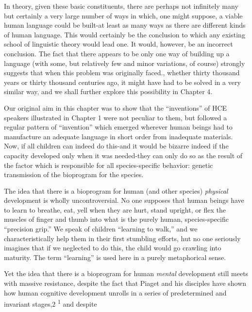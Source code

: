 In theory, given these basic constituents, there are perhaps not infinitely many but certainly a very large number of ways in which, one might suppose, a viable human language could be built-at least as many ways as there are different kinds of human language. This would certainly be the conclusion to which any existing school of linguistic theory would lead one. It would, however, be an incorrect conclusion. The fact that there appears to be only one way of building up a language (with some, but relatively few and minor variations, of course) strongly suggests that when this problem was originally faced., whether thirty thousand years or thirty thousand centuries ago, it might have had to be solved in a very similar way, and we shall further explore this possibility in Chapter 4.

Our original aim in this chapter was to show that the ``inven\-tions'' of HCE speakers illustrated in Chapter 1 were not peculiar to them, but followed a regular pattern of ``invention'' which emerged wherever human beings had to manufacture an adequate language in short order from inadequate materials. Now, if all children can indeed do this-and it would be bizarre indeed if the capacity developed only when it was needed-they can only do so as the result of the factor which is responsible for all species-specific behavior: genetic trans\-mission of the bioprogram for the species.

The idea that there is a bioprogram for human (and other spe\-cies) \textit{physical} development is wholly uncontroversial. No one supposes that human beings have to learn to breathe, eat, yell when they are hurt, stand upright, or flex the muscles of finger and thumb into what is the purely human, species-specific ``precision grip.'' We speak of children ``learning to walk,'' and we characteristically help them in their first stumbling efforts, hut no one seriously imagines that if we neglected to do this, the child would go crawling into maturity. The term ``learning'' is used here in a purely metaphorical sense.

Yet the idea that there is a bioprogram for human \textit{mental} de\-velopment still meets with massive resistance, despite the fact that Piaget and his disciples have shown how human cognitive development unrolls in a series of predetermined and invariant stages,2 \textsuperscript{1} and despite


